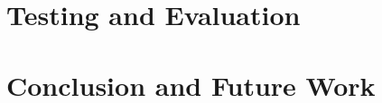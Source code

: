 \documentclass[UKenglish, a4paper]{ifimaster}
\begin{document}
\chapter{Testing and Evaluation}
\label{ch:evaluation}


\chapter{Conclusion and Future Work}

\label{ch:conclusion-and-future-work}


\backmatter{}
\printbibliography{}
\end{document}
